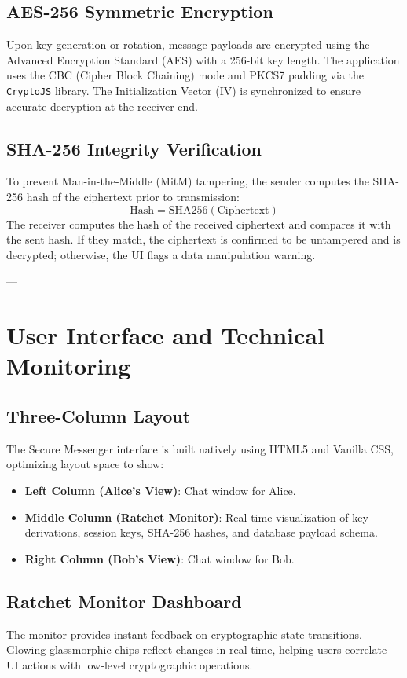 \documentclass[12pt,a4paper]{article}
\begin{document}
\subsection{AES-256 Symmetric Encryption}
Upon key generation or rotation, message payloads are encrypted using the Advanced Encryption Standard (AES) with a 256-bit key length. The application uses the CBC (Cipher Block Chaining) mode and PKCS7 padding via the \texttt{CryptoJS} library. The Initialization Vector (IV) is synchronized to ensure accurate decryption at the receiver end.

\subsection{SHA-256 Integrity Verification}
To prevent Man-in-the-Middle (MitM) tampering, the sender computes the SHA-256 hash of the ciphertext prior to transmission:
\begin{equation}
    \text{Hash} = \text{SHA256}(\text{Ciphertext})
\end{equation}
The receiver computes the hash of the received ciphertext and compares it with the sent hash. If they match, the ciphertext is confirmed to be untampered and is decrypted; otherwise, the UI flags a data manipulation warning.

---

\section{User Interface and Technical Monitoring}
\subsection{Three-Column Layout}
The Secure Messenger interface is built natively using HTML5 and Vanilla CSS, optimizing layout space to show:
\begin{itemize}
    \item \textbf{Left Column (Alice's View)}: Chat window for Alice.
    \item \textbf{Middle Column (Ratchet Monitor)}: Real-time visualization of key derivations, session keys, SHA-256 hashes, and database payload schema.
    \item \textbf{Right Column (Bob's View)}: Chat window for Bob.
\end{itemize}

\subsection{Ratchet Monitor Dashboard}
The monitor provides instant feedback on cryptographic state transitions. Glowing glassmorphic chips reflect changes in real-time, helping users correlate UI actions with low-level cryptographic operations.
\end{document}
